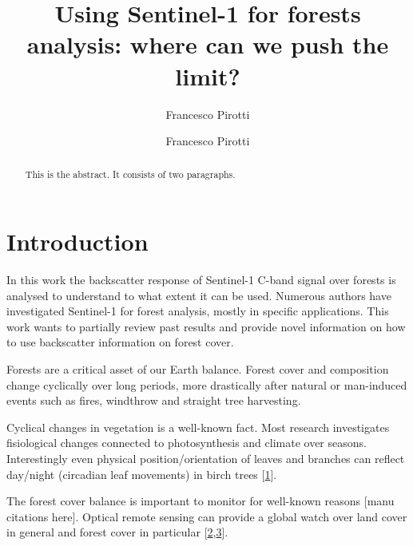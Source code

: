 \documentclass[]{elsarticle} %
\begin{document}
\begin{frontmatter}

  \title{Using Sentinel-1 for forests analysis: where can we push the limit?}
    \author[CIRGEO Interdepartmental Research Center of Research of Geomatics]{Francesco Pirotti}
    \author[TESAF Department]{Francesco Pirotti}
      \address[CIRGEO Interdepartmental Research Center of Research of Geomatics]{Agripolis, University of Padova, Legnaro 35020, Italy}
    \address[TESAF Department]{University of Padova, Legnaro 35020, Italy}
  
  \begin{abstract}
  This is the abstract. It consists of two paragraphs.
  \end{abstract}
  
 \end{frontmatter}

\hypertarget{introduction}{%
\section{Introduction}\label{introduction}}

In this work the backscatter response of Sentinel-1 C-band signal over
forests is analysed to understand to what extent it can be used.
Numerous authors have investigated Sentinel-1 for forest analysis,
mostly in specific applications. This work wants to partially review
past results and provide novel information on how to use backscatter
information on forest cover.

Forests are a critical asset of our Earth balance. Forest cover and
composition change cyclically over long periods, more drastically after
natural or man-induced events such as fires, windthrow and straight tree
harvesting.

Cyclical changes in vegetation is a well-known fact. Most research
investigates fisiological changes connected to photosynthesis and
climate over seasons. Interestingly even physical position/orientation
of leaves and branches can reflect day/night (circadian leaf movements)
in birch trees {[}\protect\hyperlink{ref-Puttonen2016}{1}{]}.

The forest cover balance is important to monitor for well-known reasons
{[}manu citations here{]}. Optical remote sensing can provide a global
watch over land cover in general and forest cover in particular
{[}\protect\hyperlink{ref-Hansen2013}{2},\protect\hyperlink{ref-Margono2014}{3}{]}.
\end{document}
